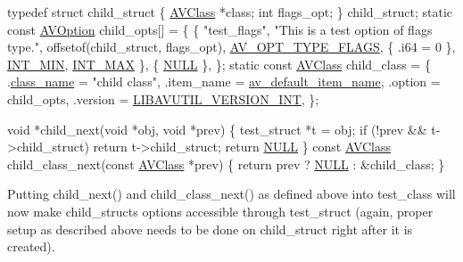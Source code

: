 \begin{DoxyCode}
\textcolor{keyword}{typedef} \textcolor{keyword}{struct }child\_struct \{
    \hyperlink{struct_a_v_class}{AVClass} *\textcolor{keyword}{class};
    \textcolor{keywordtype}{int} flags\_opt;
\} child\_struct;
\textcolor{keyword}{static} \textcolor{keyword}{const} \hyperlink{struct_a_v_option}{AVOption} child\_opts[] = \{
    \{ \textcolor{stringliteral}{"test\_flags"}, \textcolor{stringliteral}{"This is a test option of flags type."},
      offsetof(child\_struct, flags\_opt), \hyperlink{group__avoptions_ggabd75aa30eb8ad6387672df9a1fa79444a7aaeee142b88a3078ddc57c644b49a7e}{AV\_OPT\_TYPE\_FLAGS}, \{ .i64 = 0 \}, 
      \hyperlink{macint_8h_a21658776274b3d146c674318b635a334}{INT\_MIN}, \hyperlink{macint_8h_a9ec306f36d50c7375e74f0d1c55a3a67}{INT\_MAX} \},
    \{ \hyperlink{getopt1_8c_a070d2ce7b6bb7e5c05602aa8c308d0c4}{NULL} \},
\};
\textcolor{keyword}{static} \textcolor{keyword}{const} \hyperlink{struct_a_v_class}{AVClass} child\_class = \{
    .\hyperlink{struct_a_v_class_aa8883e113a3f2965abd008f7667db7eb}{class\_name} = \textcolor{stringliteral}{"child class"},
    .item\_name  = \hyperlink{group__lavu__log_ga791fcd0dba1d19fe0c3677509344328e}{av\_default\_item\_name},
    .option     = child\_opts,
    .version    = \hyperlink{group__lavu__ver_ga36e17e3fc9bcbe5c55820a8ac8b47e3c}{LIBAVUTIL\_VERSION\_INT},
\};

\textcolor{keywordtype}{void} *child\_next(\textcolor{keywordtype}{void} *obj, \textcolor{keywordtype}{void} *prev)
\{
    test\_struct *t = obj;
    \textcolor{keywordflow}{if} (!prev && t->child\_struct)
        \textcolor{keywordflow}{return} t->child\_struct;
    \textcolor{keywordflow}{return} \hyperlink{getopt1_8c_a070d2ce7b6bb7e5c05602aa8c308d0c4}{NULL}
\}
\textcolor{keyword}{const} \hyperlink{struct_a_v_class}{AVClass} child\_class\_next(\textcolor{keyword}{const} \hyperlink{struct_a_v_class}{AVClass} *prev)
\{
    \textcolor{keywordflow}{return} prev ? \hyperlink{getopt1_8c_a070d2ce7b6bb7e5c05602aa8c308d0c4}{NULL} : &child\_class;
\}
\end{DoxyCode}
 Putting child\+\_\+next() and child\+\_\+class\+\_\+next() as defined above into test\+\_\+class will now make child\+\_\+struct\textquotesingle{}s options accessible through test\+\_\+struct (again, proper setup as described above needs to be done on child\+\_\+struct right after it is created).

